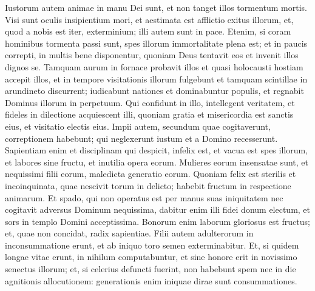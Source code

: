 \begin{biblechapter}
\begin{biblechapter}
\begin{biblechapter}
\verse Iustorum autem animae in manu Dei sunt,
 et non tanget illos tormentum mortis.
 \verse Visi sunt oculis insipientium mori,
 et aestimata est afflictio exitus illorum,
 \verse et, quod a nobis est iter, exterminium;
 illi autem sunt in pace.
 \verse Etenim, si coram hominibus tormenta passi sunt,
 spes illorum immortalitate plena est;
 \verse et in paucis correpti, in multis bene disponentur,
 quoniam Deus tentavit eos
 et invenit illos dignos se.
 \verse Tamquam aurum in fornace probavit illos
 et quasi holocausti hostiam accepit illos,
 \verse et in tempore visitationis illorum fulgebunt
 et tamquam scintillae in arundineto discurrent;
 \verse iudicabunt nationes et dominabuntur populis,
 et regnabit Dominus illorum in perpetuum.
 \verse Qui confidunt in illo, intellegent veritatem,
 et fideles in dilectione acquiescent illi,
 quoniam gratia et misericordia est sanctis eius,
 et visitatio electis eius.
 \verse Impii autem, secundum quae cogitaverunt, correptionem habebunt;
 qui neglexerunt iustum et a Domino recesserunt.
 \verse Sapientiam enim et disciplinam qui despicit, infelix est,
 et vacua est spes illorum, et labores sine fructu,
 et inutilia opera eorum.
 \verse Mulieres eorum insensatae sunt,
 et nequissimi filii eorum,
 maledicta generatio eorum.
 \verse Quoniam felix est sterilis et incoinquinata,
 quae nescivit torum in delicto;
 habebit fructum in respectione animarum.
 \verse Et spado, qui non operatus est per manus suas iniquitatem
 nec cogitavit adversus Dominum nequissima,
 dabitur enim illi fidei donum electum,
 et sors in templo Domini acceptissima.
 \verse Bonorum enim laborum gloriosus est fructus;
 et, quae non concidat, radix sapientiae.
 \verse Filii autem adulterorum in inconsummatione erunt,
 et ab iniquo toro semen exterminabitur.
 \verse Et, si quidem longae vitae erunt, in nihilum computabuntur,
 et sine honore erit in novissimo senectus illorum;
 \verse et, si celerius defuncti fuerint, non habebunt spem
 nec in die agnitionis allocutionem:
 \verse generationis enim iniquae dirae sunt consummationes.
 

\end{biblechapter}
\end{biblechapter}
\end{biblechapter}
